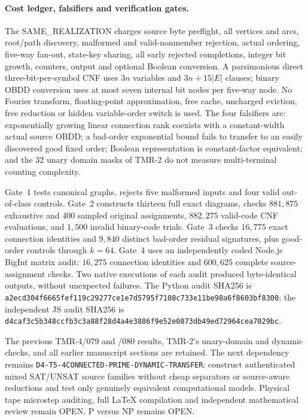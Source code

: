 \documentclass[11pt]{article}
\begin{document}
\paragraph{Cost ledger, falsifiers and verification gates.}
The SAME\_REALIZATION charges source byte preflight, all vertices and
arcs, root/path discovery, malformed and valid-nonmember rejection,
actual ordering, five-way fan-out, state-key sharing, all early
rejected completions, integer bit growth, counters, output
and optional Boolean conversion. A parsimonious direct
three-bit-per-symbol CNF uses $3n$ variables and
$3n+15|E|$ clauses; binary OBDD conversion uses at most
seven internal bit nodes per five-way node.
No Fourier transform, floating-point approximation, free cache,
uncharged eviction, free reduction or hidden variable-order switch
is used.
The four falsifiers are: exponentially growing linear connection rank
coexists with a constant-width actual source OBDD;
a bad-order exponential bound fails to transfer to an easily
discovered good fixed order; Boolean representation is
constant-factor equivalent; and the $32$ unary domain masks
of TMR-2 do not measure multi-terminal counting complexity.

Gate~1 tests canonical graphs, rejects five malformed inputs
and four valid out-of-class controls.
Gate~2 constructs thirteen full exact diagrams, checks
$881{,}875$ exhaustive and $400$ sampled original assignments,
$882{,}275$ valid-code CNF evaluations, and $1{,}500$
invalid binary-code trials.
Gate~3 checks $16{,}775$ exact connection identities and
$9{,}840$ distinct bad-order residual signatures, plus good-order
controls through $k=64$.
Gate~4 uses an independently coded Node.js BigInt matrix audit:
$16{,}275$ connection identities and $600{,}625$ complete
source-assignment checks. Two native executions of each audit
produced byte-identical outputs, without unexpected failures.
The Python audit SHA256 is
\texttt{a2ecd304f6665fef119c29277ce1e7d5795f7108c733e11be98a6f8603bf8300};
the independent JS audit SHA256 is
\texttt{d4caf3c5b348ccfb3c3a88f28d4a4e3886f9e52e0873db49ed72964cea7029bc}.

The previous TMR-4/079 and /080 results, TMR-2's unary-domain
and dynamic checks, and all earlier manuscript sections are retained.
The next dependency remains
\texttt{D4-T5-4CONNECTED-PRIME-DYNAMIC-TRANSFER}: construct
authenticated mixed SAT/UNSAT source families without
cheap separators or source-aware reductions and test only
genuinely equivalent computational models.
Physical tape microstep auditing, full \LaTeX{} compilation
and independent mathematical review remain OPEN.
P versus NP remains OPEN.
\end{document}
